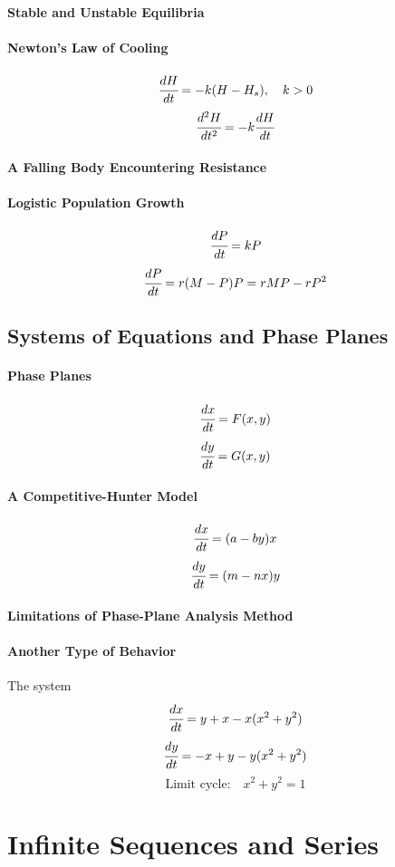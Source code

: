 \documentclass{article}
\begin{document}
            \paragraph{Stable and Unstable Equilibria}
            \paragraph{Newton's Law of Cooling}
                \[\cfrac{dH}{dt}=-k(H-H_s),\quad k>0\]
                \[\cfrac{d^2H}{dt^2}=-k\cfrac{dH}{dt}\]
            \paragraph{A Falling Body Encountering Resistance}
            \paragraph{Logistic Population Growth}
                \[\cfrac{dP}{dt}=kP\]
                \[\cfrac{dP}{dt}=r(M-P)P=rMP-rP^2\]
        \subsection{Systems of Equations and Phase Planes}
            \paragraph{Phase Planes}
            \[\cfrac{dx}{dt}=F(x,y)\]
            \[\cfrac{dy}{dt}=G(x,y)\]
            \paragraph{A Competitive-Hunter Model}
            \[\cfrac{dx}{dt}=(a-by)x\]
            \[\cfrac{dy}{dt}=(m-nx)y\]
            \paragraph{Limitations of Phase-Plane Analysis Method}
            \paragraph{Another Type of Behavior}
            The system
            \[\cfrac{dx}{dt}=y+x-x(x^2+y^2)\]
            \[\cfrac{dy}{dt}=-x+y-y(x^2+y^2)\]
            \[\text{Limit cycle:}\quad x^2+y^2=1\]

    \newpage
    \section{Infinite Sequences and Series}
\end{document}
